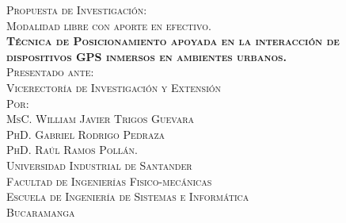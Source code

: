	\thispagestyle{empty}
	\begin{titlepage}
		\begin{center}
			\textsc{Propuesta de Investigación:\\ Modalidad libre con aporte en efectivo.}\\[1cm]
			\textsc{\Large \textbf{Técnica de Posicionamiento apoyada en la interacción de dispositivos GPS inmersos en ambientes urbanos.}}\\[4cm]
			
	
			\textsc{Presentado ante:}\\
			\textsc{Vicerectoría de Investigación y Extensión}\\[3cm]
			
			\textsc{Por:}\\
			\textsc{MsC. William Javier Trigos Guevara\\
			PhD. Gabriel Rodrigo Pedraza\\
			PhD. Raúl Ramos Pollán.
			}\\[5cm]
			\textsc{Universidad Industrial de Santander}\\
			\textsc{Facultad de Ingenierías Fisico-mecánicas}\\
			\textsc{Escuela de Ingeniería de Sistemas e Informática}\\
			\textsc{Bucaramanga}\\	
			\the\year
		\end{center}
	\end{titlepage}